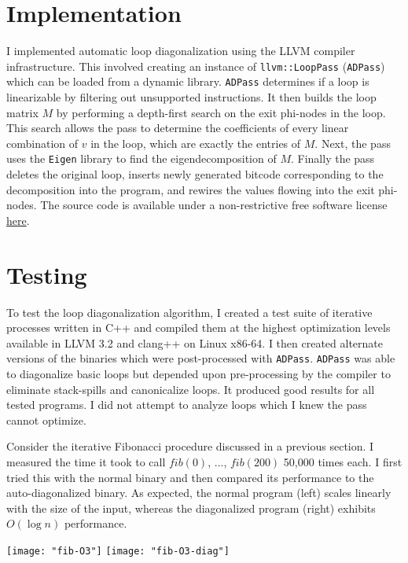 \documentclass[10pt]{article}
\begin{document}
\section{Implementation}

I implemented automatic loop diagonalization using the LLVM compiler
infrastructure. This involved creating an instance of
\texttt{llvm::LoopPass} (\texttt{ADPass}) which can be loaded from a dynamic
library. \texttt{ADPass} determines if a loop is linearizable by filtering
out unsupported instructions. It then builds the loop matrix $M$ by
performing a depth-first search on the exit phi-nodes in the loop. This
search allows the pass to determine the coefficients of every linear
combination of $v$ in the loop, which are exactly the entries of $M$. Next,
the pass uses the \texttt{Eigen} library to find the eigendecomposition of
$M$. Finally the pass deletes the original loop, inserts newly generated
bitcode corresponding to the decomposition into the program, and rewires the
values flowing into the exit phi-nodes. The source code is available under a
non-restrictive free software license
\href{https://github.com/vedantk/auto-diagonalize}{here}.

\section{Testing}

To test the loop diagonalization algorithm, I created a test suite of
iterative processes written in C++ and compiled them at the highest
optimization levels available in LLVM 3.2 and clang++ on Linux x86-64. I
then created alternate versions of the binaries which were post-processed
with \texttt{ADPass}. \texttt{ADPass} was able to diagonalize basic loops
but depended upon pre-processing by the compiler to eliminate stack-spills
and canonicalize loops. It produced good results for all tested programs. I
did not attempt to analyze loops which I knew the pass cannot optimize.

Consider the iterative Fibonacci procedure discussed in a previous section.
I measured the time it took to call $fib(0)$, ..., $fib(200)$ 50,000 times
each. I first tried this with the normal binary and then compared its
performance to the auto-diagonalized binary. As expected, the normal program
(left) scales linearly with the size of the input, whereas the diagonalized
program (right) exhibits $O(\log n)$ performance. 

\begin{center}
\texttt{[image: "fib-O3"]}
\texttt{[image: "fib-O3-diag"]}
\end{center}
\end{document}
